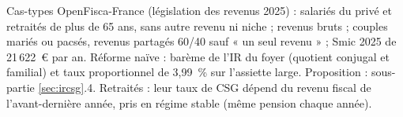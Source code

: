 \begin{table}[!htbp]
\par\vspace{3pt}\parbox{\linewidth}{\raggedright\scriptsize\color{encre}
Cas-types OpenFisca-France (législation des revenus 2025) : salariés du privé et retraités de plus de 65 ans, sans autre revenu ni niche ; revenus bruts ; couples mariés ou pacsés, revenus partagés 60/40 sauf « un seul revenu » ; Smic 2025 de 21\,622~€ par an. Réforme naïve : barème de l'IR du foyer (quotient conjugal et familial) et taux proportionnel de 3,99~\% sur l'assiette large. Proposition : sous-partie \ref{sec:ircsg}.4. Retraités : leur taux de CSG dépend du revenu fiscal de l'avant-dernière année, pris en régime stable (même pension chaque année).}
\end{table}
